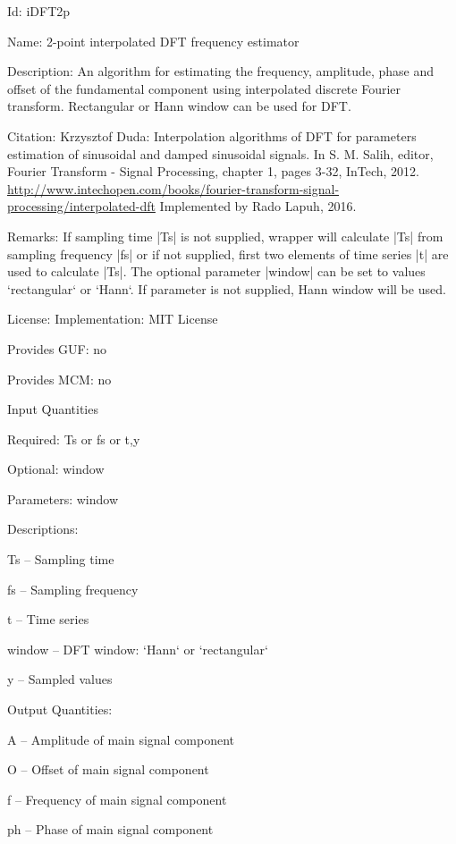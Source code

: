\begin{tightdesc}
\item [Id:] iDFT2p
\item [Name:] 2-point interpolated DFT frequency estimator
\item [Description:] An algorithm for estimating the frequency, amplitude, phase and offset of the fundamental component using interpolated discrete Fourier transform. Rectangular or Hann window can be used for DFT.
\item [Citation:] Krzysztof Duda: Interpolation algorithms of DFT for parameters estimation of sinusoidal and damped sinusoidal signals. In S. M. Salih, editor, Fourier Transform - Signal Processing, chapter 1, pages 3-32, InTech, 2012. \url{http://www.intechopen.com/books/fourier-transform-signal-processing/interpolated-dft} Implemented by Rado Lapuh, 2016.
\item [Remarks:] If sampling time |Ts| is not supplied, wrapper will calculate |Ts| from sampling frequency |fs| or if not supplied, first two elements of time series |t| are used to calculate |Ts|. The optional parameter |window| can be set to values `rectangular` or `Hann`. If parameter is not supplied, Hann window will be used.
\item [License:] Implementation: MIT License
\item [Provides GUF:] no
\item [Provides MCM:] no
\item [Input Quantities] \rule{0em}{0em}
    \begin{tightdesc}
    \item [Required:] 
        \textsf{Ts} or \textsf{fs} or \textsf{t},\enspace \textsf{y}
    \item [Optional:] 
        \textsf{window}
    \item [Parameters:] 
        \textsf{window}
    \item [Descriptions:] \rule{0em}{0em}
        \begin{tightdesc}
            \item[\textsf{Ts}] -- Sampling time
            \item[\textsf{fs}] -- Sampling frequency
            \item[\textsf{t}] -- Time series
            \item[\textsf{window}] -- DFT window: `Hann` or `rectangular`
            \item[\textsf{y}] -- Sampled values
        \end{tightdesc}
    \end{tightdesc}
\item [Output Quantities:] \rule{0em}{0em}
    \begin{tightdesc}
        \item[\textsf{A}] -- Amplitude of main signal component
        \item[\textsf{O}] -- Offset of main signal component
        \item[\textsf{f}] -- Frequency of main signal component
        \item[\textsf{ph}] -- Phase of main signal component
    \end{tightdesc}
\end{tightdesc}
